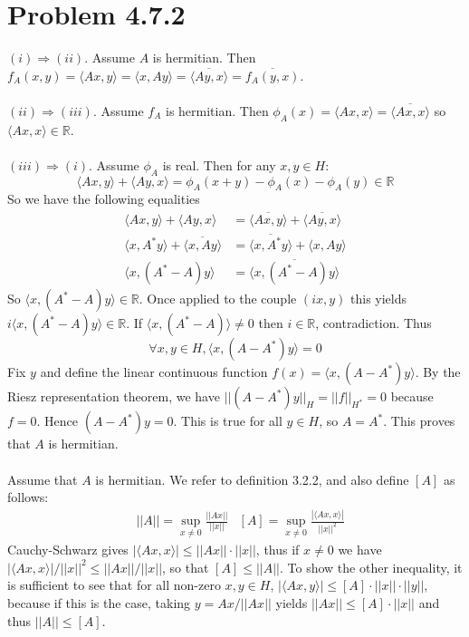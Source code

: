 \documentclass[11pt,a4paper]{article}
\newcommand{\R}{\mathbb{R}}
\newcommand{\1}{\mathbbm{1}}
\begin{document}
\section*{Problem 4.7.2}
$(i) \Rightarrow (ii)$. Assume $A$ is hermitian. Then $f_A(x,y) = \langle Ax, y \rangle = \langle x, Ay \rangle = \overline{\langle Ay , x \rangle} = \overline{ f_A(y,x) }$.\\\\
$(ii) \Rightarrow (iii)$. Assume $f_A$ is hermitian. Then $\phi_A(x) = \langle Ax, x \rangle = \overline{ \langle Ax , x \rangle}$ so $\langle Ax , x \rangle \in \R$.\\\\
$(iii) \Rightarrow (i)$. Assume $\phi_A$ is real. Then for any $x,y \in H$:
\[ \langle Ax , y \rangle + \langle Ay , x \rangle = \phi_A(x+y) - \phi_A(x) - \phi_A(y) \in \R \]
So we have the following equalities
\begin{align*}
\langle Ax , y \rangle + \langle Ay , x \rangle & = \overline{\langle Ax , y \rangle} + \overline{\langle Ay , x \rangle} \\ \langle x , A^* y \rangle + \overline{\langle x , A y \rangle} & = \overline{\langle x , A^* y \rangle} + \langle x , Ay \rangle \\
\langle x , (A^* - A) y \rangle & = \overline{\langle x , (A^*-A) y \rangle}
\end{align*}
So $\langle x , (A^* - A) y \rangle \in \R$. Once applied to the couple $(ix,y)$ this yields $i \langle x , (A^* - A)y \rangle \in \R$. If $\langle x , (A^* - A) \rangle \neq 0$ then $i \in \R$, contradiction. Thus
\[ \forall x,y \in H, \langle x, (A-A^*)y \rangle = 0 \]
Fix $y$ and define the linear continuous function $f(x) = \langle x , (A-A^*)y \rangle$. By the Riesz representation theorem, we have $||(A-A^*)y||_H = ||f||_{H^*} = 0$ because $f = 0$. Hence $(A-A^*)y = 0$. This is true for all $y \in H$, so $A = A^*$. This proves that $A$ is hermitian.\\\\
Assume that $A$ is hermitian. We refer to definition 3.2.2, and also define $[A]$ as follows:
\begin{align*} & ||A|| = \sup_{x \neq 0} \frac{||Ax||}{||x||} & [A] = \sup_{x \neq 0} \frac{|\langle Ax , x \rangle|}{||x||^2} \end{align*}
Cauchy-Schwarz gives $|\langle Ax , x \rangle| \leq ||Ax|| \cdot ||x||$, thus if $x \neq 0$ we have $|\langle Ax , x \rangle|/||x||^2 \leq ||Ax||/||x||$, so that $[A] \leq ||A||$. To show the other inequality, it is sufficient to see that for all non-zero $x,y \in H$, $|\langle Ax , y \rangle| \leq [A] \cdot ||x||\cdot||y||$, because if this is the case, taking $y = Ax/||Ax||$ yields $||Ax|| \leq [A]\cdot ||x||$ and thus $||A|| \leq [A]$.\\\\
\end{document}
